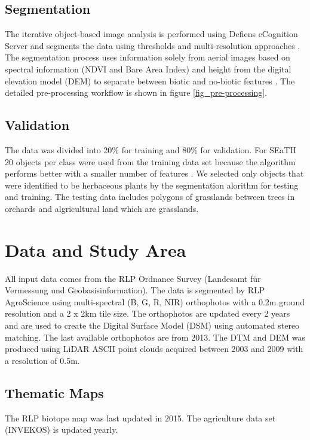 \documentclass[authoryear, review,12pt,number]{elsarticle}
\begin{document}
\subsection{Segmentation} 
\label{subsec_segmentation}
The iterative object-based image analysis is performed using Defiens eCognition
Server and segments the data using thresholds and multi-resolution approaches 
\citep{baatz2001ecognition}.
The segmentation process uses information solely from
aerial images based on spectral information (NDVI and Bare Area Index) and
height from the digital elevation model (DEM) to separate between biotic and
no-biotic features \citep{Tintrup2015}. The detailed pre-processing workflow is
shown in figure \ref{fig_pre-processing}.
\subsection{Validation} 
The data was divided into 20\% for training and 80\% for validation. For SEaTH
20 objects per class were used from the training data set because the algorithm
performs better with a smaller number of features \citep{Nussbaum2006}. We 
selected only objects that were identified to be herbaceous plants by the 
segmentation alorithm for testing and training. The testing 
data includes polygons of grasslands between trees in orchards and 
algricultural land which are grasslands.
\section{Data and Study Area}
All input data comes from the RLP Ordnance Survey (Landesamt f\"ur Vermessung 
und Geobasisinformation). The data is segmented by RLP AgroScience using
multi-spectral (B, G, R, NIR) orthophotos with a 0.2m ground resolution and a
2 x 2km tile size. The orthophotos are updated every 2 years and are used to
create the Digital Surface Model (DSM) using automated stereo matching. The
last available orthophotos are from 2013. The DTM and
DEM was produced using LiDAR ASCII point clouds acquired between 2003 and 2009
with a resolution of 0.5m.\\
\subsection{Thematic Maps} The RLP biotope map was last updated in 2015. The
agriculture data set (INVEKOS) is updated yearly. 
\end{document}
